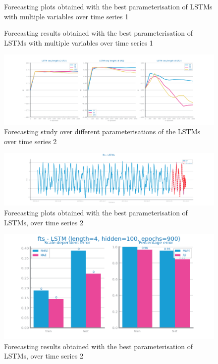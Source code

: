 \documentclass[10pt]{extarticle}
\begin{document}
\begin{figure}[H]
\caption{Forecasting plots obtained with the best parameterisation of LSTMs with multiple variables over time series 1}
\end{figure}

\begin{figure}[H]
\caption{Forecasting results obtained with the best parameterisation of LSTMs with multiple variables over time series 1}
\end{figure}

\begin{figure}[H]
\centering\includegraphics[scale=0.4]{images/dataset2/time_series/fts_lstm_study_R2_8.png}
\caption{Forecasting study over different parameterisations of the LSTMs over time series 2}
\end{figure}

\begin{figure}[H]
\centering\includegraphics[scale=0.4]{images/dataset2/time_series/fts_lstms_R2_forecast.png}
\caption{Forecasting plots obtained with the best parameterisation of LSTMs, over time series 2}
\end{figure}

\begin{figure}[H]
\centering\includegraphics[scale=0.5]{images/dataset2/time_series/fts_lstms_R2_eval.png}
\caption{Forecasting results obtained with the best parameterisation of LSTMs, over time series 2}
\end{figure}
\end{document}
